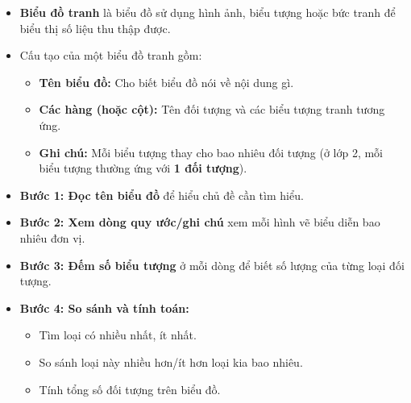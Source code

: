 \documentclass[10pt,a4paper]{article}
\begin{document}
\noindent
\begin{minipage}[t]{0.49\textwidth}\vspace{0pt}
\begin{tcolorbox}[
  enhanced,
  colback=violet!4!white,
  colframe=violet!75!black,
  arc=2mm, boxrule=0.8pt,
  left=2mm, right=2mm, top=1.8mm, bottom=1.8mm,
  title={\footnotesize\bfseries\color{white}\faKey\ 1. Khái niệm biểu đồ tranh}
]
{\footnotesize
\begin{itemize}\setlength{\itemsep}{1pt}\setlength{\leftskip}{-2.5mm}
  \item \textbf{Biểu đồ tranh} là biểu đồ sử dụng hình ảnh, biểu tượng hoặc bức tranh để biểu thị số liệu thu thập được.
  \item Cấu tạo của một biểu đồ tranh gồm:
  \begin{itemize}\setlength{\itemsep}{0.5pt}\setlength{\leftskip}{-2mm}
    \item \textbf{Tên biểu đồ:} Cho biết biểu đồ nói về nội dung gì.
    \item \textbf{Các hàng (hoặc cột):} Tên đối tượng và các biểu tượng tranh tương ứng.
    \item \textbf{Ghi chú:} Mỗi biểu tượng thay cho bao nhiêu đối tượng (ở lớp 2, mỗi biểu tượng thường ứng với \textbf{1 đối tượng}).
  \end{itemize}
\end{itemize}
}
\end{tcolorbox}
\end{minipage}
\hfill
\begin{minipage}[t]{0.49\textwidth}\vspace{0pt}
\begin{tcolorbox}[
  enhanced,
  colback=teal!4!white,
  colframe=teal!75!black,
  arc=2mm, boxrule=0.8pt,
  left=2mm, right=2mm, top=1.8mm, bottom=1.8mm,
  title={\footnotesize\bfseries\color{white}\faSliders\ 2. Các bước đọc và khai thác biểu đồ tranh}
]
{\footnotesize
\begin{itemize}\setlength{\itemsep}{1pt}\setlength{\leftskip}{-2.5mm}
  \item \textbf{Bước 1: Đọc tên biểu đồ} để hiểu chủ đề cần tìm hiểu.
  \item \textbf{Bước 2: Xem dòng quy ước/ghi chú} xem mỗi hình vẽ biểu diễn bao nhiêu đơn vị.
  \item \textbf{Bước 3: Đếm số biểu tượng} ở mỗi dòng để biết số lượng của từng loại đối tượng.
  \item \textbf{Bước 4: So sánh và tính toán:}
  \begin{itemize}\setlength{\itemsep}{0.5pt}\setlength{\leftskip}{-2mm}
    \item Tìm loại có nhiều nhất, ít nhất.
    \item So sánh loại này nhiều hơn/ít hơn loại kia bao nhiêu.
    \item Tính tổng số đối tượng trên biểu đồ.
  \end{itemize}
\end{itemize}
}
\end{tcolorbox}
\end{minipage}
\end{document}
